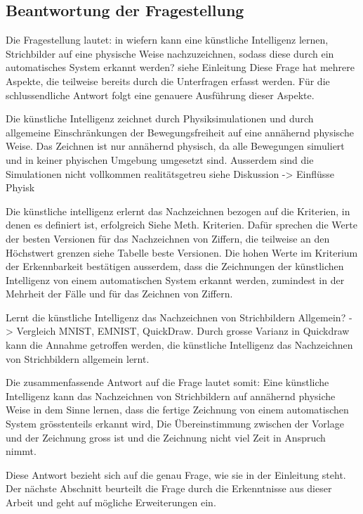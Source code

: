 \subsection{Beantwortung der Fragestellung}
Die Fragestellung lautet: in wiefern kann eine künstliche Intelligenz lernen,
Strichbilder auf eine physische Weise nachzuzeichnen, sodass diese durch ein
automatisches System erkannt werden? {siehe Einleitung} Diese Frage hat mehrere
Aspekte, die teilweise bereits durch die Unterfragen erfasst werden. Für die
schlussendliche Antwort folgt eine genauere Ausführung dieser Aspekte.

Die künstliche Intelligenz zeichnet durch Physiksimulationen und durch allgemeine
Einschränkungen der Bewegungsfreiheit auf eine annähernd physische Weise. Das
Zeichnen ist nur annähernd physisch, da alle Bewegungen simuliert und in
keiner phyischen Umgebung umgesetzt sind. Ausserdem sind die Simulationen
nicht vollkommen realitätsgetreu {siehe Diskussion -> Einflüsse Phyisk }

Die künstliche intelligenz erlernt das Nachzeichnen bezogen auf die Kriterien,
in denen es definiert ist, erfolgreich {Siehe Meth. Kriterien}. Dafür sprechen
die Werte der besten Versionen für das Nachzeichnen von Ziffern, die teilweise
an den Höchstwert grenzen {siehe Tabelle beste Versionen}. Die hohen Werte im
Kriterium der Erkennbarkeit bestätigen ausserdem, dass die Zeichnungen der
künstlichen Intelligenz von einem automatischen System erkannt werden, zumindest
in der Mehrheit der Fälle und für das Zeichnen von Ziffern.

Lernt die künstliche Intelligenz das Nachzeichnen von Strichbildern Allgemein?
-> Vergleich MNIST, EMNIST, QuickDraw. Durch grosse Varianz in Quickdraw kann
die Annahme getroffen werden, die künstliche Intelligenz das Nachzeichnen von
Strichbildern allgemein lernt.

Die zusammenfassende Antwort auf die Frage lautet somit: Eine künstliche
Intelligenz kann das Nachzeichnen von Strichbildern auf annähernd physiche Weise
in dem Sinne lernen, dass die fertige Zeichnung von einem automatischen System
grösstenteils erkannt wird, Die Übereinstimmung zwischen der Vorlage und der
Zeichnung gross ist und die Zeichnung nicht viel Zeit in Anspruch nimmt.

Diese Antwort bezieht sich auf die genau Frage, wie sie in der Einleitung steht.
Der nächste Abschnitt beurteilt die Frage durch die Erkenntnisse aus dieser
Arbeit und geht auf mögliche Erweiterungen ein.



